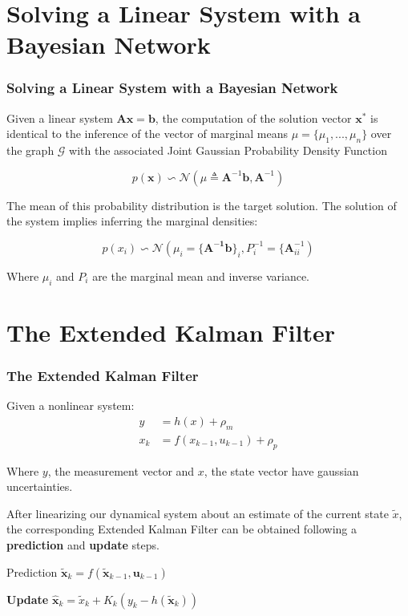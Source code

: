 \documentclass[xcolor=dvipsnames]{beamer}
\begin{document}
\section{Solving a Linear System with a Bayesian Network}
\begin{frame}
  \frametitle{Solving a Linear System with a Bayesian Network}
  Given a linear system $\mathbf{Ax} = \mathbf{b}$, the computation of the solution vector $\mathbf{x^*}$ is identical to the inference of the vector of marginal means $\mu = \{\mu_1, ... , \mu_n\}$ over the graph $\mathcal{G}$ with the associated Joint Gaussian Probability Density Function
  
 \begin{equation}
  p(\mathbf{x}) \backsim \mathcal{N}(\mu \triangleq \mathbf{A}^{-1}\mathbf{b}, \mathbf{A}^{-1})
 \end{equation}

 The mean of this probability distribution is the target solution. The solution of the system implies inferring the marginal densities:
 
 \begin{equation}
  p(x_i) \backsim \mathcal{N}(\mu_i = \{\mathbf{A^{-1}}\mathbf{b}\}_i,P^{-1}_i = \{\mathbf{A}^{-1}_{ii})
 \end{equation}
 
 Where $\mu_i$ and $P_i$ are the marginal mean and inverse variance.

\end{frame}



\section{The Extended Kalman Filter}
\begin{frame}
  \frametitle{The Extended Kalman Filter}
  Given a nonlinear system:
  \begin{align}
   y &= h(x) + \rho_m \\
   x_k &= f(x_{k-1}, u_{k-1}) + \rho_p
  \end{align}
  
  Where $y$, the measurement vector and $x$, the state vector have gaussian uncertainties.

  After linearizing our dynamical system about an estimate of the current state $\tilde{x}$, the corresponding Extended Kalman Filter can be obtained following a \textbf{prediction} and \textbf{update} steps.
  \begin{alertblock}{Prediction}
    $\mathbf{\tilde{x}}_k = f(\mathbf{\tilde{x}}_{k-1}, \mathbf{u}_{k-1})$
  \end{alertblock}
  
  \begin{alertblock}{\textbf{Update}}
    $\mathbf{\hat{x}}_k = \tilde{x}_k + K_k(y_k - h(\mathbf{\tilde{x}}_k))$
  \end{alertblock}

\end{frame}
\end{document}

